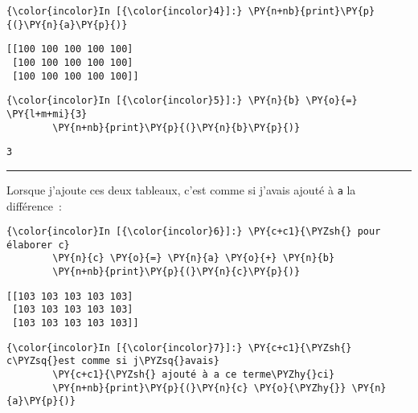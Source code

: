     \begin{Verbatim}[commandchars=\\\{\},frame=single,framerule=0.3mm,rulecolor=\color{cellframecolor}]
{\color{incolor}In [{\color{incolor}4}]:} \PY{n+nb}{print}\PY{p}{(}\PY{n}{a}\PY{p}{)}
\end{Verbatim}


    \begin{Verbatim}[commandchars=\\\{\},frame=single,framerule=0.3mm,rulecolor=\color{cellframecolor}]
[[100 100 100 100 100]
 [100 100 100 100 100]
 [100 100 100 100 100]]
\end{Verbatim}

    \begin{Verbatim}[commandchars=\\\{\},frame=single,framerule=0.3mm,rulecolor=\color{cellframecolor}]
{\color{incolor}In [{\color{incolor}5}]:} \PY{n}{b} \PY{o}{=} \PY{l+m+mi}{3}
        \PY{n+nb}{print}\PY{p}{(}\PY{n}{b}\PY{p}{)}
\end{Verbatim}


    \begin{Verbatim}[commandchars=\\\{\},frame=single,framerule=0.3mm,rulecolor=\color{cellframecolor}]
3
\end{Verbatim}

    \begin{center}\rule{0.5\linewidth}{\linethickness}\end{center}

    Lorsque j'ajoute ces deux tableaux, c'est comme si j'avais ajouté à
\texttt{a} la différence~:

    \begin{Verbatim}[commandchars=\\\{\},frame=single,framerule=0.3mm,rulecolor=\color{cellframecolor}]
{\color{incolor}In [{\color{incolor}6}]:} \PY{c+c1}{\PYZsh{} pour élaborer c}
        \PY{n}{c} \PY{o}{=} \PY{n}{a} \PY{o}{+} \PY{n}{b}
        \PY{n+nb}{print}\PY{p}{(}\PY{n}{c}\PY{p}{)}
\end{Verbatim}


    \begin{Verbatim}[commandchars=\\\{\},frame=single,framerule=0.3mm,rulecolor=\color{cellframecolor}]
[[103 103 103 103 103]
 [103 103 103 103 103]
 [103 103 103 103 103]]
\end{Verbatim}

    \begin{Verbatim}[commandchars=\\\{\},frame=single,framerule=0.3mm,rulecolor=\color{cellframecolor}]
{\color{incolor}In [{\color{incolor}7}]:} \PY{c+c1}{\PYZsh{} c\PYZsq{}est comme si j\PYZsq{}avais}
        \PY{c+c1}{\PYZsh{} ajouté à a ce terme\PYZhy{}ci}
        \PY{n+nb}{print}\PY{p}{(}\PY{n}{c} \PY{o}{\PYZhy{}} \PY{n}{a}\PY{p}{)}
\end{Verbatim}



